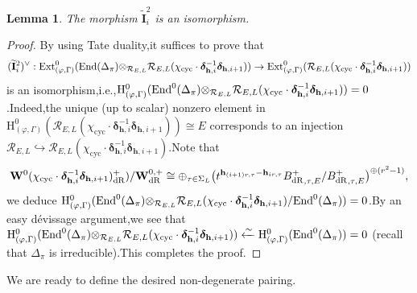 \documentclass[SecEq,CM,GP]{degruyter-crelle} %
\theoremstyle{plain}
\newtheorem{lem}[thm]{Lemma}
\newcommand{\bdr}{{B^+_{\mathrm{dR}}}}
\newcommand{\dr}{{\rm dR}}
\newcommand{\EndO}{{\rm End}}
\newcommand{\ext}{{\rm Ext}}
\newcommand{\hH}{{\mathrm{H}}}
\newcommand{\tee}{{{\otimes}_{\cR_{E,L}}}}
\newcommand{\bW}{{\mathbf{W}}}
\newcommand{\bh}{{\mathbf{h}}}
\newcommand{\cR}{\mathcal R}
\begin{document}
\begin{lem}\label{isoI2i}The morphism $\widetilde{\mathbf{I}}_{i}^2$ is an isomorphism.\;
\end{lem}
\begin{proof}By using Tate duality,\;it suffices to prove that $$(\widetilde{\mathbf{I}}_{i}^2)^\vee:\ext^0_{(\varphi,\Gamma)}(\EndO(\Delta_{\pi})\tee \cR_{E,L}(\chi_{\mathrm{cyc}}\cdot\bm{\delta}_{\bh,i}^{-1}\bm{\delta}_{\bh,i+1}))
\rightarrow  \ext^0_{(\varphi,\Gamma)}(\cR_{E,L}(\chi_{\mathrm{cyc}}\cdot\bm{\delta}_{\bh,i}^{-1}\bm{\delta}_{\bh,i+1}))$$ 
is an isomorphism,\;i.e.,\;$\hH^0_{(\varphi,\Gamma)}(\EndO^0(\Delta_{\pi})\tee \cR_{E,L}(\chi_{\mathrm{cyc}}\cdot\bm{\delta}_{\bh,i}^{-1}\bm{\delta}_{\bh,i+1}))=0$.\;Indeed,\;the unique (up to scalar) nonzero element in  $\hH^0_{(\varphi,\Gamma)}(\cR_{E,L}(\chi_{\mathrm{cyc}}\cdot\bm{\delta}_{\bh,i}^{-1}\bm{\delta}_{\bh,i+1}))\cong E$ corresponds to an injection $\cR_{E,L}\hookrightarrow \cR_{E,L}(\chi_{\mathrm{cyc}}\cdot\bm{\delta}_{\bh,i}^{-1}\bm{\delta}_{\bh,i+1})$.\;Note that
\begin{eqnarray*}
	\bW^0(\chi_{\mathrm{cyc}}\cdot\bm{\delta}_{\bh,i}^{-1}\bm{\delta}_{\bh,i+1})^+_{\dr})/\bW^{0,+}_{\dr}
	\cong \oplus_{\tau\in \Sigma_L}\big(t^{\bh_{(i+1)r,\tau}-\bh_{ir,\tau}}\bdr_{,\tau,E}/\bdr_{,\tau,E}\big)^{\oplus (r^2-1)},
\end{eqnarray*}
we deduce $\hH^0_{(\varphi,\Gamma)}(\EndO^0(\Delta_{\pi})\tee \cR_{E,L}(\chi_{\mathrm{cyc}}\cdot\bm{\delta}_{\bh,i}^{-1}\bm{\delta}_{\bh,i+1})/\EndO^0(\Delta_{\pi}))=0$.\;By an easy d\'{e}vissage argument,\;we see that $\hH^0_{(\varphi,\Gamma)}(\EndO^0(\Delta_{\pi})\tee \cR_{E,L}(\chi_{\mathrm{cyc}}\cdot\bm{\delta}_{\bh,i}^{-1}\bm{\delta}_{\bh,i+1}))\xleftarrow{\sim}\hH^0_{(\varphi,\Gamma)}(\EndO^0(\Delta_{\pi}))=0$ (recall that $\Delta_{\pi}$ is irreducible).\;This completes the proof.\;
\end{proof}

We are ready to define the desired non-degenerate pairing.\;
\end{document}
